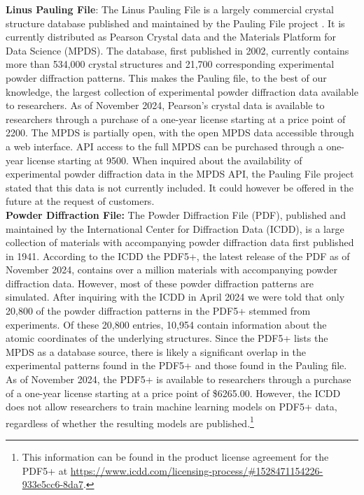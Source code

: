 \textbf{Linus Pauling File}:\cite{PaulingWeb} The Linus Pauling File is a largely commercial crystal structure database published and maintained by the Pauling File project \cite{villars2018}. It is currently distributed as Pearson Crystal data \cite{PearsonWeb} and the Materials Platform for Data Science (MPDS)\cite{MPDSWeb}. The database, first published in 2002, currently contains more than 534,000 crystal structures\cite{MPDSWeb} and 21,700 corresponding experimental powder diffraction patterns\cite{PearsonWeb}. 
This makes the Pauling file, to the best of our knowledge, the largest collection of experimental powder diffraction data available to researchers. As of November 2024, Pearson's crystal data is available to researchers through a purchase of a one-year license starting at a price point of \qty{2200}{\myeuro}\cite{PearsonBuy}. The MPDS is partially open, with the open MPDS data accessible through a web interface\cite{MPDSWeb}. API access to the full MPDS can be purchased through a one-year license starting at \qty{9500}{\myeuro}\cite{MPDSBuy}. When inquired about the availability of experimental powder diffraction data in the MPDS API, the Pauling File project stated that this data is not currently included. It could however be offered in the future at the request of customers. \\

\textbf{Powder Diffraction File:} \cite{PDFWeb} The Powder Diffraction File (PDF), published and maintained by the International Center for Diffraction Data (ICDD), is a large collection of materials with accompanying powder diffraction data first published in 1941\cite{GatesRector2019}. According to the ICDD the PDF5+, the latest release of the PDF as of November 2024, contains over a million materials with accompanying powder diffraction data. However, most of these powder diffraction patterns are simulated. After inquiring with the ICDD in April 2024 we were told that only 20,800 of the powder diffraction patterns in the PDF5+ stemmed from experiments. Of these 20,800 entries, 10,954 contain information about the atomic coordinates of the underlying structures. Since the PDF5+ lists the MPDS as a database source, there is likely a significant overlap in the experimental patterns found in the PDF5+ and those found in the Pauling file. As of November 2024, the PDF5+ is available to researchers through a purchase of a one-year license starting at a price point of \$6265.00. However, the ICDD does not allow researchers to train machine learning models on PDF5+ data, regardless of whether the resulting models are published.\footnote{This information can be found in the product license agreement for the PDF5+ at \url{https://www.icdd.com/licensing-process/\#1528471154226-933e5cc6-8da7}.} \\

